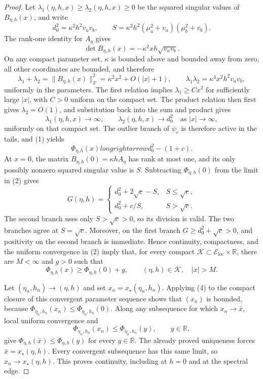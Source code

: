 \documentclass{article}
\begin{document}
\begin{proof}
Let \(\lambda_1(\eta,h,x)\geq\lambda_2(\eta,h,x)\geq0\) be the squared singular values of \(B_{\eta,h}(x)\), and write
\[
 d_0^2=\kappa^2h^2v_av_b,
 \qquad
 S=\kappa^2h^2(\mu_a^2+v_a)(\mu_b^2+v_b).
\]
The rank-one identity for \(A_\eta\) gives
\[
 \det B_{\eta,h}(x)=-\kappa^2xh\sqrt{v_av_b}.
\]
On any compact parameter set, \(\kappa\) is bounded above and bounded away from zero, all other coordinates are bounded, and therefore
\[
 \lambda_1+\lambda_2
 =\|B_{\eta,h}(x)\|_F^2
 =\kappa^2x^2+O(|x|+1),
 \qquad
 \lambda_1\lambda_2=\kappa^4x^2h^2v_av_b,
\]
uniformly in the parameters.  The first relation implies \(\lambda_1\geq Cx^2\) for sufficiently large \(|x|\), with \(C>0\) uniform on the compact set.  The product relation then first gives \(\lambda_2=O(1)\), and substitution back into the sum and product gives
\[
 \lambda_1(\eta,h,x)\longrightarrow\infty,
 \qquad
 \lambda_2(\eta,h,x)\longrightarrow d_0^2
 \quad\text{as }|x|\longrightarrow\infty, \tag{1}
\]
uniformly on that compact set.  The outlier branch of \(\psi_c\) is therefore active in the tails, and (1) yields
\[
 \Phi_{\eta,h}(x)longrightarrow d_0^2-(1+c). \tag{2}
\]
At \(x=0\), the matrix \(B_{\eta,h}(0)=\kappa hA_\eta\) has rank at most one, and its only possibly nonzero squared singular value is \(S\).  Subtracting \(\Phi_{\eta,h}(0)\) from the limit in (2) gives
\[
 G(\eta,h)=
 \begin{cases}
 d_0^2+2\sqrt c-S,&S\leq\sqrt c,\\
 d_0^2+c/S,&S>\sqrt c.
 \end{cases} \tag{3}
\]
The second branch uses only \(S>\sqrt c>0\), so its division is valid.  The two branches agree at \(S=\sqrt c\).  Moreover, on the first branch \(G\geq d_0^2+\sqrt c>0\), and positivity on the second branch is immediate.  Hence continuity, compactness, and the uniform convergence in (2) imply that, for every compact \(\mathcal K\subset\mathcal E_{\mathrm{loc}}\times\mathbb R\), there are \(M<\infty\) and \(g>0\) such that
\[
 \Phi_{\eta,h}(x)\geq\Phi_{\eta,h}(0)+g,
 \qquad (\eta,h)\in\mathcal K,\quad |x|>M. \tag{4}
\]

Let \((\eta_n,h_n)\to(\eta,h)\) and set \(x_n=x_\star(\eta_n,h_n)\).  Applying (4) to the compact closure of this convergent parameter sequence shows that \((x_n)\) is bounded, because \(\Phi_{\eta_n,h_n}(x_n)\leq\Phi_{\eta_n,h_n}(0)\).  Along any subsequence for which \(x_n\to\bar x\), local uniform convergence and
\[
 \Phi_{\eta_n,h_n}(x_n)\leq\Phi_{\eta_n,h_n}(y),
 \qquad y\in\mathbb R,
\]
give \(\Phi_{\eta,h}(\bar x)\leq\Phi_{\eta,h}(y)\) for every \(y\in\mathbb R\).  The already proved uniqueness forces \(\bar x=x_\star(\eta,h)\).  Every convergent subsequence has this same limit, so \(x_n\to x_\star(\eta,h)\).  This proves continuity, including at \(h=0\) and at the spectral edge.


\end{proof}
\end{document}
